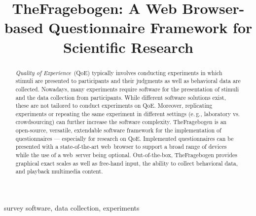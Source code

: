 \documentclass[conference,a4paper]{IEEEtran}
\newcommand{\eg}{e.\,g.}
\begin{document}
\title{TheFragebogen: A Web Browser-based Questionnaire Framework for Scientific Research}

\author{
\and
{}
\and
\and
{}
\and
{}
}

\newcommand{\afblock}[1]{\noindent{\textbf{#1}}}
\IEEEoverridecommandlockouts {}
\maketitle

\begin{abstract}
\emph{Quality of Experience}~(QoE) typically involves conducting experiments in which stimuli are presented to participants and their judgments as well as behavioral data are collected.
Nowadays, many experiments require software for the presentation of stimuli and the data collection from participants.
While different software solutions exist, these are not tailored to conduct experiments on QoE.
Moreover, replicating experiments or repeating the same experiment in different settings (\eg, laboratory vs. crowdsourcing) can further increase the software complexity.
TheFragebogen is an open-source, versatile, extendable software framework for the implementation of questionnaires --- especially for research on QoE.
Implemented questionnaires can be presented with a state-of-the-art web~browser to support a broad range of devices while the use of a web~server being optional.
Out-of-the-box, TheFragebogen provides graphical exact scales as well as free-hand input, the ability to collect behavioral data, and playback multimedia content.
\end{abstract}

\begin{IEEEkeywords}
survey software, data collection, experiments
\end{IEEEkeywords}
\end{document}
